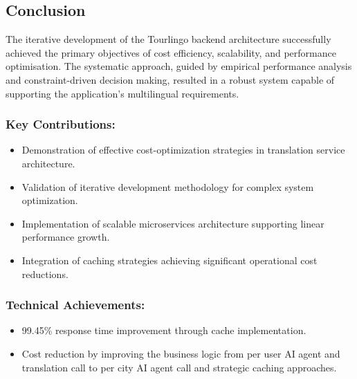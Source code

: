 \subsection{Conclusion}

The iterative development of the Tourlingo backend architecture successfully achieved the primary objectives of cost efficiency, scalability, and performance optimisation. The systematic approach, guided by empirical performance analysis and constraint-driven decision making, resulted in a robust system capable of supporting the application's multilingual requirements.

\subsubsection{Key Contributions:}
\begin{itemize}
    \item Demonstration of effective cost-optimization strategies in translation service architecture.
    \item Validation of iterative development methodology for complex system optimization.
    \item Implementation of scalable microservices architecture supporting linear performance growth.
    \item Integration of caching strategies achieving significant operational cost reductions.
\end{itemize}

\subsubsection{Technical Achievements:}
\begin{itemize}
    \item 99.45\% response time improvement through cache implementation.
    \item Cost reduction by improving the business logic from per user AI agent and translation call to per city AI agent call and strategic caching approaches.
\end{itemize}


